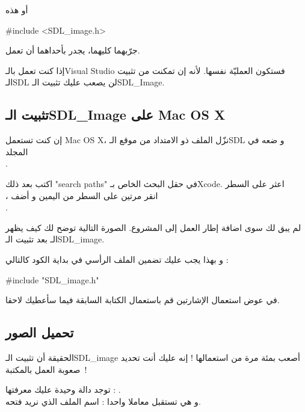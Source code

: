 أو هذه

\begin{Csource}
#include <SDL_image.h>
\end{Csource}

جرّبهما كليهما، يجدر بأحداهما أن تعمل.

\begin{information}
إذا كنت تعمل بالـ\textenglish{Visual Studio}
فستكون العمليّة نفسها. لأنه إن تمكنت من تثبيت الـ\textenglish{SDL}
لن يصعب عليك تثبيت الـ\textenglish{SDL\_Image}.
\end{information}

\subsection{تثبيت الـ\textenglish{SDL\_Image} على \textenglish{Mac OS X}}


إن كنت تستعمل
\textenglish{Mac OS X}،
نزّل الملف ذو الامتداد
من موقع الـ\textenglish{SDL}
و ضعه في المجلد\\
.

اكتب بعد ذلك
"\textenglish{search paths}"
 في حقل البحث الخاص بـ\textenglish{Xcode}.
 اعثر على السطر\\
،
 انقر مرتين على السطر من اليمين و أضف\\
.

لم يبق لك سوى اضافة إطار العمل إلى المشروع. الصورة التالية توضح لك كيف يظهر\\
الـ
بعد تثبيت الـ\textenglish{SDL\_image}.


و بهذا يجب عليك تضمين الملف الرأسي في بداية الكود كالتالي :
\begin{Csource}
#include "SDL_image.h"
\end{Csource}
في عوض استعمال الإشارتين
\InlineCode{< >}
 قم باستعمال الكتابة السابقة فيما سأعطيك لاحقا.

\subsection{تحميل الصور}

الحقيقة أن تثبيت الـ\textenglish{SDL\_image}
أصعب بمئة مرة من استعمالها ! إنه عليك أنت تحديد صعوبة العمل بالمكتبة~! 

توجد دالة وحيدة عليك معرفتها : 
.\\
و هي تستقبل معاملا واحدا : اسم الملف الذي نريد فتحه.

